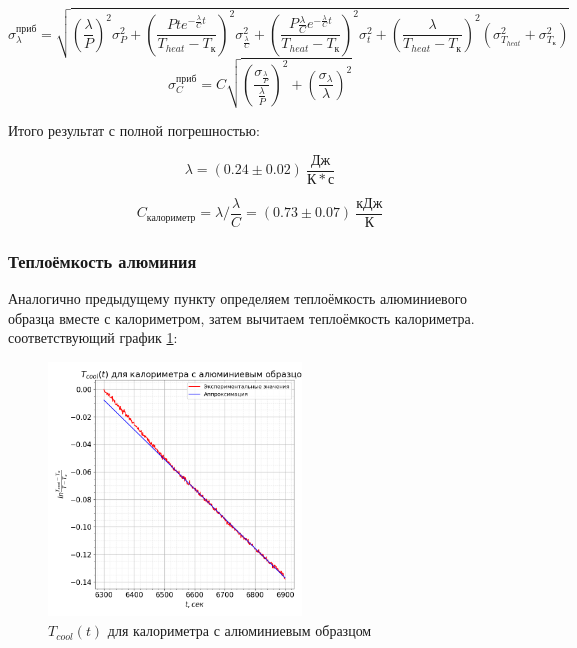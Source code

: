 \documentclass[a4paper, 12pt]{article}
\begin{document}
                \begin{equation*}
                    \sigma_{\lambda}^{приб} = \sqrt{\left( \frac{\lambda}{P} \right)^2 \sigma_P^2 + \left( \frac{P t e^{-\frac{\lambda}{C} t}}{T_{heat} - T_к} \right)^2 \sigma_{\frac{\lambda}{C}}^2 + \left( \frac{P \frac{\lambda}{C} e^{-\frac{\lambda}{C} t}}{T_{heat} - T_к} \right)^2 \sigma_t^2 + \left( \frac{\lambda}{T_{heat} - T_к} \right)^2 \left( \sigma_{T_{heat}}^2 + \sigma_{T_к}^2 \right)}
                \end{equation*}
                \begin{equation*}
                    \sigma_C^{приб} = C \sqrt{\left( \frac{ \sigma_{\frac{\lambda}{P}}}{\frac{\lambda}{P}} \right)^2 + \left( \frac{\sigma_{\lambda}}{\lambda} \right)^2}
                \end{equation*}

                Итого результат с полной погрешностью:

                \begin{equation*}
                    \lambda = (0.24 \pm 0.02)~\frac{Дж}{К*с}
                \end{equation*}

                \begin{equation*}
                    C_{калориметр} = \lambda / \frac{\lambda}{C} = (0.73 \pm 0.07)~\frac{кДж}{К}
                \end{equation*}

            \subsubsection{Теплоёмкость алюминия}

                Аналогично предыдущему пункту определяем теплоёмкость алюминиевого образца вместе с калориметром, затем вычитаем теплоёмкость калориметра. соответствующий график \ref{plot:T_cool_2}:

                \begin{figure}[ht]
                    \centering
                    \includegraphics[width=0.6\textwidth]{img/graph_cool_2.png}
                    \caption{$T_{cool}(t)$ для калориметра с алюминиевым образцом}
                    \label{plot:T_cool_2}
                \end{figure}
\end{document}
